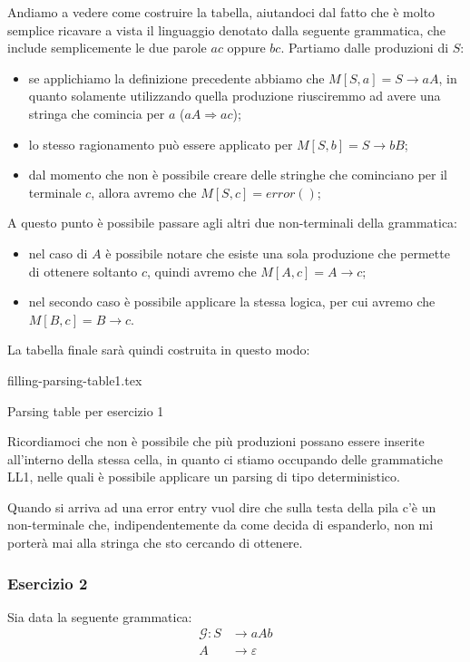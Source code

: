 \documentclass[class=book, crop=false, oneside, 12pt]{standalone}
\begin{document}
Andiamo a vedere come costruire la tabella, aiutandoci dal fatto che è molto semplice ricavare a vista il linguaggio denotato dalla seguente grammatica, che include semplicemente le due parole \(ac\) oppure \(bc\). Partiamo dalle produzioni di \(S\):
\begin{itemize}
    \item se applichiamo la definizione precedente abbiamo che \(M[S, a] = S \rightarrow aA\), in quanto solamente utilizzando quella produzione riusciremmo ad avere una stringa che comincia per \(a\) (\(aA \Rightarrow ac\));
    \item lo stesso ragionamento può essere applicato per \(M[S, b] = S \rightarrow bB\);
    \item dal momento che non è possibile creare delle stringhe che cominciano per il terminale \(c\), allora avremo che \(M[S, c] = error()\);
\end{itemize}
A questo punto è possibile passare agli altri due non-terminali della grammatica: 
\begin{itemize}
    \item nel caso di \(A\) è possibile notare che esiste una sola produzione che permette di ottenere soltanto \(c\), quindi avremo che \(M[A, c] = A \rightarrow c\);
    \item nel secondo caso è possibile applicare la stessa logica, per cui avremo che \(M[B, c] = B \to c\).
\end{itemize} 
La tabella finale sarà quindi costruita in questo modo:

\begin{table}[H]
	\centering
	{filling-parsing-table1.tex}
    \caption{Parsing table per esercizio 1}
    \label{filling-parsing-table1}
\end{table} 

Ricordiamoci che non è possibile che più produzioni possano essere inserite all'interno della stessa cella, in quanto ci stiamo occupando delle grammatiche LL1, nelle quali è possibile applicare un parsing di tipo deterministico. 

Quando si arriva ad una error entry vuol dire che sulla testa della pila c'è un non-terminale che, indipendentemente da come decida di espanderlo, non mi porterà mai alla stringa che sto cercando di ottenere. 

\subsubsection{Esercizio 2}
Sia data la seguente grammatica:
\begin{align*}
    \mathcal{G}: S &\rightarrow aAb \\
    A &\rightarrow \varepsilon
\end{align*}
\end{document}
